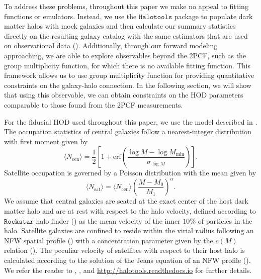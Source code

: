 To address these problems, throughout this paper we make no appeal to fitting functions or emulators. 
Instead, we use the $\mathtt{Halotools}$ package to populate dark matter halos with mock galaxies and 
then calculate our summary statistics directly on the resulting galaxy catalog with the same estimators 
that are used on observational data (\citealt{Hearin:2016aa}). Additionally, through our forward modeling approaching, we are
able to explore observables beyond the 2PCF, such as the group multiplicity function, for which 
there is no available fitting function. This framework allows us to use group multiplicity function for providing quantitative constraints on the galaxy-halo connection. In the following section, we will show that using this observable, we can obtain constraints on the HOD parameters comparable to those found from the 2PCF measurements. 

For the fiducial HOD used throughout this paper, we use the model described in \citealt{zheng07}. 
The occupation statistics of central galaxies follow a nearest-integer distribution with first 
moment given by 
\begin{equation}
\label{eq:ncen}
\langle N_{\mathrm{cen}}\rangle = \frac{1}{2} \left[ 1 + \mathrm{erf}\left(\frac{\log M - \log M_{\mathrm{min}}}{\sigma_{\log M}}\right)\right].
\end{equation}
Satellite occupation is governed by a Poisson distribution with the mean given by 
\begin{equation}
\label{eq:nsat}
\langle N_{\mathrm{sat}}\rangle =  \langle N_{\mathrm{cen}} \rangle \left(\frac{M-M_{0}}{M_1}\right)^{\alpha}.
\end{equation}
We assume that central galaxies are seated at the exact center of the host dark matter halo and 
are at rest with respect to the halo velocity, defined according to $\mathtt{Rockstar}$ halo finder (\cite{rockstar})
as the mean velocity of the inner $10\%$ of particles in the halo. Satellite galaxies are confined to 
reside within the virial radius following an NFW spatial profile (\citealt{nfw}) with a concentration 
parameter given by the $c(M)$ relation (\citealt{nfw_c(M)}). The peculiar velocity of satellites with 
respect to their host halo is calculated according to the solution of the Jeans equation of an NFW 
profile (\citealt{more2010}). We refer the reader to \cite{hearin15}, 
\cite{Hearin:2016aa}, and \url{http://halotools.readthedocs.io}
for further details.  


